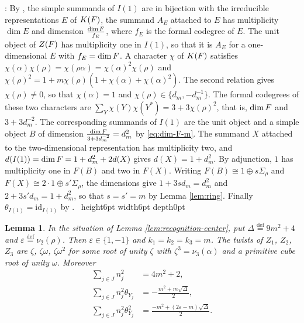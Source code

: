 \documentclass[leqno]{article}
\let\cal\relax
\newcommand{\cal}{\mathcal}
\newcommand{\qed}{\hfill \vrule height6pt  width6pt depth0pt}
\newcommand{\ov}{\overset}
\newcommand{\epsi}{\varepsilon}
\newtheorem{lemma}[thm]{Lemma}
\newenvironment{proof}[1][]{\noindent {\it Proof #1} : }{\hbox{~}\qed
\smallskip
}
\numberwithin{equation}{section}
\begin{document}
\begin{proof}
By \cite[Theorem 2.13 p.~6]{Ost15}, the simple summands of $I(1)$ are in bijection with the irreducible representations $E$ of $K(\cal F)$, the summand $A_E$ attached to $E$ has multiplicity $\dim E$ and dimension $\frac{\dim \cal F}{f_E}$, where $f_E$ is the formal codegree of $E$. The unit object of $Z(\cal F)$ has multiplicity one in $I(1)$, so that it is $A_E$ for a one-dimensional $E$ with $f_E = \dim \cal F$. A character $\chi$ of $K(\cal F)$ satisfies $\chi(\alpha)\chi(\rho) = \chi(\rho\alpha) = \chi(\alpha)^2\chi(\rho)$ and $\chi(\rho)^2 = 1+m\chi(\rho)(1+\chi(\alpha)+\chi(\alpha)^2)$. The second relation gives $\chi(\rho) \neq 0$, so that $\chi(\alpha) = 1$ and $\chi(\rho) \in \{d_m,-d_m^{-1}\}$. The formal codegrees of these two characters are $\sum_Y \chi(Y)\chi(Y^*) = 3+3\chi(\rho)^2$, that is, $\dim\cal F$ and $3+3d_m^{-2}$. The corresponding summands of $I(1)$ are the unit object and a simple object $B$ of dimension $\frac{\dim\cal F}{3+3d_m^{-2}} = d_m^2$ by \eqref{eq:dim-F-m}. The summand $X$ attached to the two-dimensional representation has multiplicity two, and $d(I(1)) = \dim \cal F = 1+d_m^2+2d(X)$ gives $d(X) = 1+d_m^2$. By adjunction, $1$ has multiplicity one in $F(B)$ and two in $F(X)$. Writing $F(B) \cong 1 \oplus s\Sigma_\rho$ and $F(X) \cong 2\cdot 1 \oplus s'\Sigma_\rho$, the dimensions give $1+3s d_m = d_m^2$ and $2+3s'd_m = 1+d_m^2$, so that $s = s' = m$ by Lemma \ref{lem:ring}. Finally $\theta_{I(1)} = \mathrm{id}_{I(1)}$ by \cite[Theorem 2.5 p.~4]{Ost15}.
\end{proof}

\begin{lemma}
\label{lem:moments}
In the situation of Lemma \ref{lem:recognition-center}, put $\Delta \ov{\mathrm{def}}{=} 9m^2+4$ and $\epsi \ov{\mathrm{def}}{=} \nu_2(\rho)$. Then $\epsi \in \{1,-1\}$ and $k_1 = k_2 = k_3 = m$. The twists of $Z_1$, $Z_2$, $Z_3$ are $\zeta$, $\zeta\omega$, $\zeta\omega^2$ for some root of unity $\zeta$ with $\zeta^3 = \nu_3(\alpha)$ and a primitive cube root of unity $\omega$. Moreover
\begin{align}
\label{eq:moment-0}
\sum_{j \in J} n_j^2 &= 4m^2+2,\\
\label{eq:moment-1}
\sum_{j \in J} n_j^2 \theta_{Y_j} &= -\frac{m^2+m\sqrt{\Delta}}{2},\\
\label{eq:moment-2}
\sum_{j \in J} n_j^2 \theta_{Y_j}^2 &= \frac{-m^2+(2\epsi-m)\sqrt{\Delta}}{2}.
\end{align}
\end{lemma}
\end{document}

